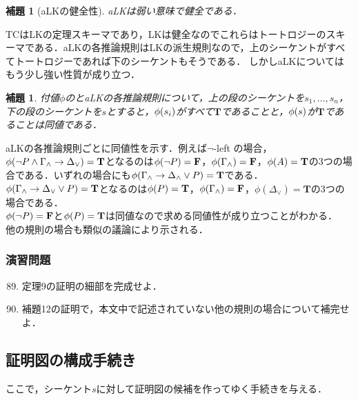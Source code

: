\documentclass{ltjsarticle}
\makeatletter
\theoremstyle{mystyle1}
\theoremstyle{mystyle3}
\newtheorem{lem}[cor]{補題}
\theoremstyle{mystyle2}
\renewenvironment{proof}[1][\proofname]{\par
  \pushQED{\qed}%
  \normalfont
  \topsep6\p@\@plus6\p@ \trivlist
  \item[\hskip\labelsep{\bfseries\sffamily #1}]\ignorespaces
}{%
  \popQED\endtrivlist\@endpefalse
}
\renewcommand\proofname{証明:}
\newcommand{\bT}{\ensuremath{\mathbf{T}}}
\newcommand{\bF}{\ensuremath{\mathbf{F}}}
\makeatother
\begin{document}
\begin{lem}[aLKの健全性]
  aLKは弱い意味で健全である．
\end{lem}
\begin{proof}
  TCはLKの定理スキーマであり，LKは健全なのでこれらはトートロジーのスキーマである．aLKの各推論規則はLKの派生規則なので，上のシーケントがすべてトートロジーであれば下のシーケントもそうである．
\end{proof}
しかしaLKについてはもう少し強い性質が成り立つ．
\begin{lem}
  付値$\phi$のとaLKの各推論規則について，上の段のシーケントを$s_1,\ldots,s_n$，下の段のシーケントを$s$とすると，$\phi\qty(s_i)$がすべて\bT であることと，$\phi\qty(s)$が\bT であることは同値である．
\end{lem}
\begin{proof}
  aLKの各推論規則ごとに同値性を示す．例えば$\neg$-left の場合，$\phi\qty(\neg P\wedge\Gamma_\wedge\to\Delta_\vee)=\bT$となるのは$\phi\qty(\neg P)=\bF$，$\phi\qty(\Gamma_\wedge)=\bF$，$\phi\qty(A)=\bT$の3つの場合である．いずれの場合にも$\phi\qty(\Gamma_\wedge\to\Delta_\wedge\vee P)=\bT$である．$\phi\qty(\Gamma_\wedge\to\Delta_\vee\vee P)=\bT$となるのは$\phi\qty(P)=\bT$，$\phi\qty(\Gamma_\wedge)=\bF$，$\phi(\Delta_\vee)=\bT$の3つの場合である．\\
  $\phi\qty(\neg P)=\bF$と$\phi\qty(P)=\bT$は同値なので求める同値性が成り立つことがわかる．\\
  他の規則の場合も類似の議論により示される．
\end{proof}
\subsubsection*{演習問題}
\begin{enumerate}
  \setcounter{enumi}{88}
  \item 定理9の証明の細部を完成せよ．
  \item 補題12の証明で，本文中で記述されていない他の規則の場合について補完せよ．
\end{enumerate}
\subsection{証明図の構成手続き}
ここで，シーケント$s$に対して証明図の候補を作ってゆく手続きを与える．
\end{document}
